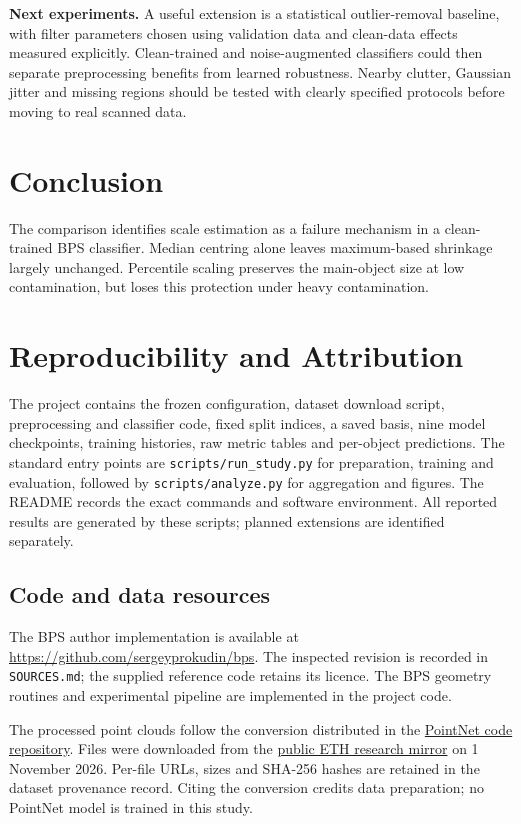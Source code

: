 \documentclass[11pt,a4paper]{article}
\begin{document}
\textbf{Next experiments.} A useful extension is a statistical outlier-removal baseline, with filter parameters chosen using validation data and clean-data effects measured explicitly. Clean-trained and noise-augmented classifiers could then separate preprocessing benefits from learned robustness. Nearby clutter, Gaussian jitter and missing regions should be tested with clearly specified protocols before moving to real scanned data.

\section{Conclusion}
The comparison identifies scale estimation as a failure mechanism in a clean-trained BPS classifier. Median centring alone leaves maximum-based shrinkage largely unchanged. Percentile scaling preserves the main-object size at low contamination, but loses this protection under heavy contamination.



\clearpage

\section*{Reproducibility and Attribution}
The project contains the frozen configuration, dataset download script, preprocessing and classifier code, fixed split indices, a saved basis, nine model checkpoints, training histories, raw metric tables and per-object predictions. The standard entry points are \texttt{scripts/run\_study.py} for preparation, training and evaluation, followed by \texttt{scripts/analyze.py} for aggregation and figures. The README records the exact commands and software environment. All reported results are generated by these scripts; planned extensions are identified separately.

\subsection*{Code and data resources}
The BPS author implementation is available at \url{https://github.com/sergeyprokudin/bps}. The inspected revision is recorded in \texttt{SOURCES.md}; the supplied reference code retains its licence. The BPS geometry routines and experimental pipeline are implemented in the project code.

The processed point clouds follow the conversion distributed in the \href{https://github.com/charlesq34/pointnet}{PointNet code repository}. Files were downloaded from the \href{https://share.phys.ethz.ch/~gseg/Predator/data/modelnet40_ply_hdf5_2048/}{public ETH research mirror} on 1 November 2026. Per-file URLs, sizes and SHA-256 hashes are retained in the dataset provenance record. Citing the conversion credits data preparation; no PointNet model is trained in this study.
\end{document}
